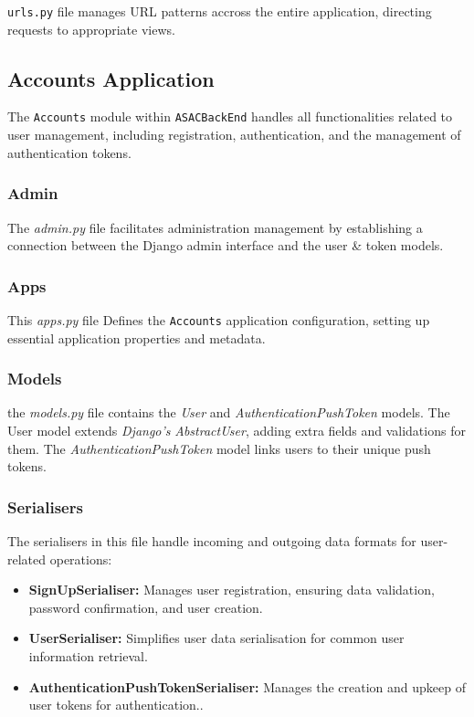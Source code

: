 \texttt{urls.py} file manages URL patterns accross the entire application, directing requests to appropriate views.

\subsection{Accounts Application}

The \texttt{Accounts} module within \texttt{ASACBackEnd} handles all functionalities related to user management, including registration, authentication, and the management of authentication tokens.

\subsubsection{Admin} 

The \textit{admin.py} file facilitates administration management by establishing a connection between the Django admin interface and the user \& token models.

\subsubsection{Apps} 

This \textit{apps.py} file Defines the \texttt{Accounts} application configuration, setting up essential application properties and metadata.

\subsubsection{Models} 

the \textit{models.py} file contains the \textit{User} and \textit{AuthenticationPushToken} models. The User model extends \textit{Django's} \textit{AbstractUser}, adding extra fields and validations for them. The \textit{AuthenticationPushToken} model links users to their unique push tokens.

\subsubsection{Serialisers}

The serialisers in this file handle incoming and outgoing data formats for user-related operations:

\begin{itemize}
    \item \textbf{SignUpSerialiser:} Manages user registration, ensuring data validation, password confirmation, and user creation.
    \item \textbf{UserSerialiser:} Simplifies user data serialisation for common user information retrieval.
    \item \textbf{AuthenticationPushTokenSerialiser:} Manages the creation and upkeep of user tokens for authentication..
\end{itemize}

